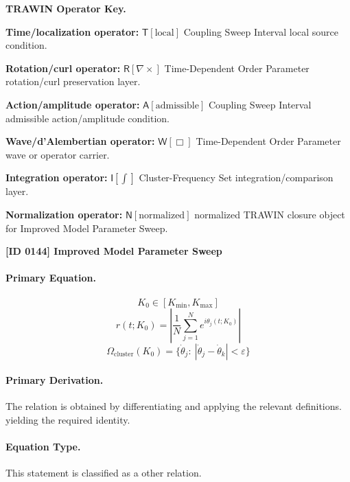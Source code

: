 \par\vspace{0.45\baselineskip}
\noindent\begin{minipage}[t]{\linewidth}
\begingroup
\small
\raggedright
\textbf{TRAWIN Operator Key.}\par
\noindent\textbf{Time/localization operator:} $\mathsf{T}\!\left[\mathrm{local}\right]$ Coupling Sweep Interval local source condition.\par
\noindent\textbf{Rotation/curl operator:} $\mathsf{R}\!\left[\nabla\times\right]$ Time-Dependent Order Parameter rotation/curl preservation layer.\par
\noindent\textbf{Action/amplitude operator:} $\mathsf{A}\!\left[\mathrm{admissible}\right]$ Coupling Sweep Interval admissible action/amplitude condition.\par
\noindent\textbf{Wave/d'Alembertian operator:} $\mathsf{W}\!\left[\Box\right]$ Time-Dependent Order Parameter wave or operator carrier.\par
\noindent\textbf{Integration operator:} $\mathsf{I}\!\left[\int\right]$ Cluster-Frequency Set integration/comparison layer.\par
\noindent\textbf{Normalization operator:} $\mathsf{N}\!\left[\mathrm{normalized}\right]$ normalized TRAWIN closure object for Improved Model Parameter Sweep.\par
\endgroup
\end{minipage}

\clearpage
\noindent\textbf{[ID 0144] Improved Model Parameter Sweep}\par
\vspace{0.35em}
\paragraph{Primary Equation.}
\[
K_0\in [K_{\min},K_{\max}]
\]
\[
r(t;K_0)=\left|\frac{1}{N}\sum_{j=1}^{N}e^{i\theta_j(t;K_0)}\right|
\]
\[
\Omega_{\mathrm{cluster}}(K_0)=\{\dot{\theta}_j:\ |\dot{\theta}_j-\dot{\theta}_k|<\varepsilon\}
\]

\paragraph{Primary Derivation.}
The relation is obtained by differentiating and applying the relevant definitions. yielding the required identity.
\paragraph{Equation Type.}
This statement is classified as a other relation.

